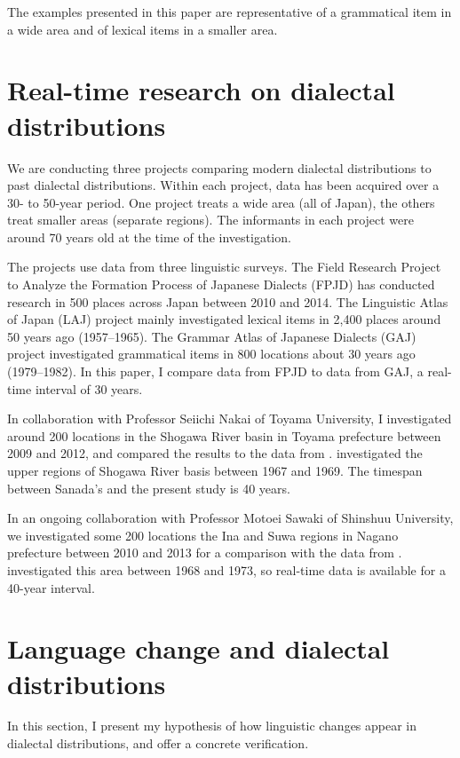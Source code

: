 \documentclass[output=paper]{LSP/langsci}
\begin{document}
The examples presented in this paper are representative of a grammatical item in a wide area and of lexical items in a smaller area. 

\section{Real-time research on dialectal distributions}

We are conducting three projects comparing modern dialectal distributions to past dialectal distributions. Within each project, data has been acquired over a 30- to 50-year period. One project treats a wide area (all of Japan),  the others treat smaller areas (separate regions). The informants in each project were around 70 years old at the time of the investigation.

The projects use data from three linguistic surveys. The Field Research Project to Analyze the Formation Process of Japanese Dialects (FPJD) has conducted research in 500 places across Japan between 2010 and 2014. The Linguistic Atlas of Japan (LAJ) project mainly investigated lexical items in 2,400 places around 50 years ago (1957--1965). The Grammar Atlas of Japanese Dialects (GAJ) project investigated grammatical items in 800 locations about 30 years ago (1979--1982). In this paper, I compare data from FPJD to data from GAJ, a real-time interval of 30 years.

In collaboration with Professor Seiichi Nakai of Toyama University, I investigated around 200 locations in the Shogawa River basin in Toyama prefecture between 2009 and 2012, and compared the results to the data from \citet{sanada_ecchu-hida_1976}. \citeauthor{sanada_ecchu-hida_1976} investigated the upper regions of Shogawa River basis between 1967 and 1969. The timespan between Sanada’s and the present study is 40 years.

In an ongoing collaboration with Professor Motoei Sawaki of Shinshuu University, we investigated some 200 locations the Ina and Suwa regions in Nagano prefecture between 2010 and 2013 for a comparison with the data from \citet{mase_kami-ina-no_1980}. \citeauthor{mase_kami-ina-no_1980} investigated this area between 1968 and 1973, so real-time data is available for a 40-year interval.

\section{Language change and dialectal distributions}\label{sec:lgchdialdist}
In this section, I present my hypothesis of how linguistic changes appear in dialectal distributions, and offer a concrete verification.
\end{document}
